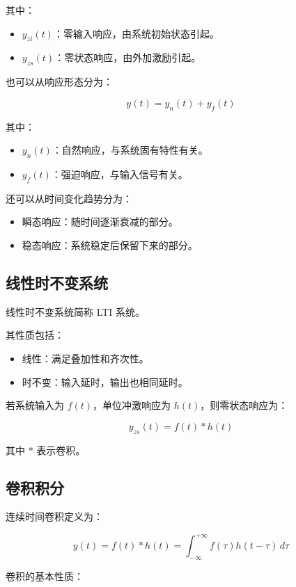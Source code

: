 \documentclass[UTF8]{ctexart}
\begin{document}
其中：

\begin{itemize}
    \item $y_{zi}(t)$：零输入响应，由系统初始状态引起。
    \item $y_{zs}(t)$：零状态响应，由外加激励引起。
\end{itemize}

也可以从响应形态分为：

\[
y(t)=y_n(t)+y_f(t)
\]

其中：

\begin{itemize}
    \item $y_n(t)$：自然响应，与系统固有特性有关。
    \item $y_f(t)$：强迫响应，与输入信号有关。
\end{itemize}

还可以从时间变化趋势分为：

\begin{itemize}
    \item 瞬态响应：随时间逐渐衰减的部分。
    \item 稳态响应：系统稳定后保留下来的部分。
\end{itemize}

\subsection{线性时不变系统}

线性时不变系统简称 LTI 系统。

其性质包括：

\begin{itemize}
    \item 线性：满足叠加性和齐次性。
    \item 时不变：输入延时，输出也相同延时。
\end{itemize}

若系统输入为 $f(t)$，单位冲激响应为 $h(t)$，则零状态响应为：

\[
y_{zs}(t)=f(t)*h(t)
\]

其中 $*$ 表示卷积。

\subsection{卷积积分}

连续时间卷积定义为：

\[
y(t)=f(t)*h(t)=\int_{-\infty}^{+\infty}f(\tau)h(t-\tau)\,d\tau
\]

卷积的基本性质：
\end{document}
